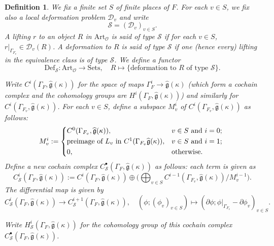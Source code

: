 \documentclass[12pt,oneside,reqno]{amsart}
\theoremstyle{plain}
\newtheorem{definition}[theorem]{Definition}
\begin{document}
	
	
	
	
	\begin{definition}\label{T-deformation or lifting of type S}
		We fix a finite set $S$ of finite places of $F$.
		For each $v\in S$,
		we fix also a local deformation problem
		$\mathcal{D}_v$ and write
		\[
		\mathcal{S}=(\mathcal{D}_v)_{v\in S}.
		\]
		A lifting
		$r$ to
		an object $R$ in
		$\mathrm{Art}_\mathcal{O}$
		is said
		\emph{of type $\mathcal{S}$}
		if
		for each $v\in S$,
		$r|_{\Gamma_{F_v}}
		\in
		\mathcal{D}_v(R)$.
		A deformation to $R$ is said
		\emph{of type $\mathcal{S}$}
		if one (hence every) lifting in the equivalence class
		is of type $\mathcal{S}$.		
		We define a functor
		\[
		\mathrm{Def}_\mathcal{S}
		\colon
		\mathrm{Art}_\mathcal{O}
		\rightarrow
		\mathrm{Sets},\quad
		R
		\mapsto
		\{
		\text{deformation to }R \text{ of type }\mathcal{S}
		\}.
		\]
		
		
		
		Write
		$C^i(\Gamma_F,\widehat{\mathfrak{g}}(\kappa))$
		for the space of maps
		$\Gamma_F^i
		\rightarrow
		\widehat{\mathfrak{g}}(\kappa)$
		(which form a cochain complex and the cohomology
		groups are
		$H^i(\Gamma_F,\widehat{\mathfrak{g}}(\kappa))$)
		and similarly for
		$C^i(\Gamma_{F_v},\widehat{\mathfrak{g}}(\kappa))$.
		For each $v\in S$,
		define a subspace
		$M_v^i$ of
		$C^i(\Gamma_{F_v},\widehat{\mathfrak{g}}(\kappa))$ as follows:
		\[
		M_v^i
		:=
		\begin{cases*}
			C^0(\Gamma_{F_v},\widehat{\mathfrak{g}}(\kappa)),
			&
			$v\in S$ and $i=0$;
			\\
			\text{preimage of }L_v
			\text{ in }
			C^1(\Gamma_{F_v}\widehat{\mathfrak{g}}(\kappa)),
			&
			$v\in S$ and $i=1$;
			\\
			0,
			&
			otherwise.
		\end{cases*}
		\]
		Define a new cochain complex $C_{\mathcal{S}}^\bullet(\Gamma_{F},\widehat{\mathfrak{g}}(\kappa))$
		as follows:
		each term is given as
		\[
		C_{\mathcal{S}}^i(\Gamma_F,\widehat{\mathfrak{g}}(\kappa))
		:=
		C^i(\Gamma_F,\widehat{\mathfrak{g}}(\kappa))
		\oplus
		\big(
		\bigoplus_{v\in S}
		C^{i-1}(\Gamma_{F_v},\widehat{\mathfrak{g}}(\kappa))
		/M_v^{i-1}
		\big).
		\]
		The differential map is given  by
		\[
		C^i_{\mathcal{S}}
		(\Gamma_F,\widehat{\mathfrak{g}}(\kappa))
		\rightarrow
		C^{i+1}_{\mathcal{S}}
		(\Gamma_F,\widehat{\mathfrak{g}}(\kappa)),
		\quad
		(\phi;(\phi_v)_{v\in S})
		\mapsto
		(\partial\phi;\phi|_{\Gamma_{F_v}}-\partial\phi_v)_{v\in S}.
		\]
		
		Write
		$H^i_{\mathcal{S}}(\Gamma_F,
		\widehat{\mathfrak{g}}(\kappa))$
		for the cohomology group of this cochain complex
		$C_{\mathcal{S}}^\bullet(\Gamma_{F},\widehat{\mathfrak{g}}(\kappa))$.
	\end{definition}
	
\end{document}
